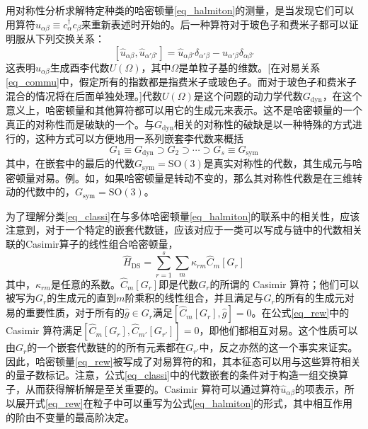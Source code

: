 用对称性分析求解特定种类的哈密顿量\ref{eq_halmiton}的测量，是当发现它们可以用算符$\hat{u}_{\alpha\beta}\equiv c_{\alpha}^\dag c_\beta$来重新表述时开始的。后一种算符对于玻色子和费米子都可以证明服从下列交换关系：
\begin{equation}\label{eq_commu}
[\hat{u}_{\alpha\beta},\hat{u}_{\alpha'\beta'}]=\hat{u}_{\alpha\beta'}\delta_{\alpha'\beta}-\hat{u}_{\alpha'\beta}\delta_{\alpha\beta'}
\end{equation}
这表明$\hat{u}_{\alpha\beta}$生成酉李代数$U(\Omega)$，其中$\Omega$是单粒子基的维数。[在对易关系\ref{eq_commu}中，假定所有的指数都是指费米子或玻色子。而对于玻色子和费米子混合的情况将在后面单独处理。]代数$U(\Omega)$是这个问题的动力学代数$G_\textrm{dyn}$，在这个意义上，哈密顿量和其他算符都可以用它的生成元来表示。这不是哈密顿量的一个真正的对称性而是破缺的一个。与$G_\textrm{dyn}$相关的对称性的破缺是以一种特殊的方式进行的，这种方式可以方便地用一系列嵌套李代数来概括
\begin{equation}\label{eq_classi}
G_1\equiv G_\textrm{dyn}\supset G_2\supset\cdots\supset G_s\equiv G_\textrm{sym}
\end{equation}
其中，在嵌套中的最后的代数$G_\textrm{sym}=\textrm{SO}(3)$是真实对称性的代数，其生成元与哈密顿量对易。例。如，如果哈密顿量是转动不变的，那么其对称性代数是在三维转动的代数中的，$G_\textrm{sym}=\textrm{SO}(3)$。

为了理解分类\ref{eq_classi}在与多体哈密顿量\ref{eq_halmiton}的联系中的相关性，应该注意到，对于一个特定的嵌套代数链，应该对应于一类可以写成与链中的代数相关联的Casimir算子的线性组合哈密顿量，
\begin{equation}\label{eq_rew}
\hat{H}_\textrm{DS}=\sum_{r=1}^s\sum_m\kappa_{rm}\hat{C}_m[G_r]
\end{equation}
其中，$\kappa_{rm}$是任意的系数。$\hat{C}_m[G_r]$即是代数$G_r$的所谓的 Casimir 算符；他们可以被写为$G_r$的生成元的直到$m$阶乘积的线性组合，并且满足与$G_r$的所有的生成元对易的重要性质，对于所有的$\hat{g}\in G_r$满足$[\hat{C}_m[G_r],\hat{g}]=0$。在公式\ref{eq_rew}中的 Casimir 算符满足$[\hat{C}_m[G_r],\hat{C}_{m'}[G_{r'}]]=0$，即他们都相互对易。这个性质可以由$G_r$的一个嵌套代数链的的所有元素都在$G_{r'}$中，反之亦然的这一个事实来证实。因此，哈密顿量\ref{eq_rew}被写成了对易算符的和，其本征态可以用与这些算符相关的量子数标记。注意，公式\ref{eq_classi}中的代数嵌套的条件对于构造一组交换算子，从而获得解析解是至关重要的。Casimir 算符可以通过算符$\hat{u}_{\alpha\beta}$的项表示，所以展开式\ref{eq_rew}在粒子中可以重写为公式\ref{eq_halmiton}的形式，其中相互作用的阶由不变量的最高阶决定。


